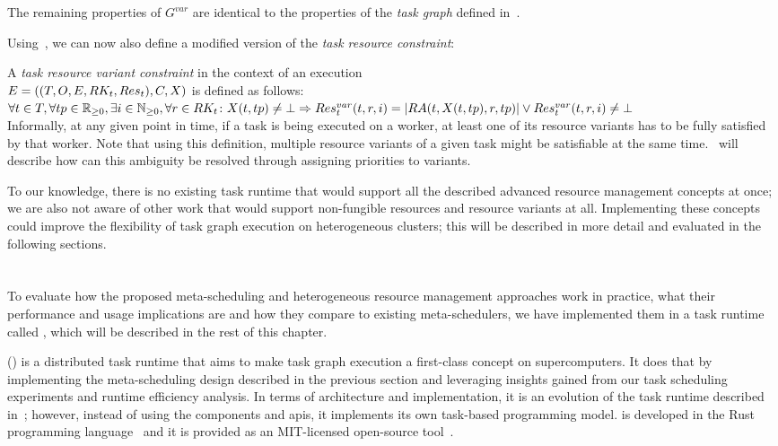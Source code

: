 The remaining properties of $G^{var}$ are identical to the properties of the
\emph{task graph} defined in~.

Using~, we can now also define a modified version of the
\emph{task resource constraint}:

\vspace{2mm} A \emph{task resource variant constraint}
in the context of an execution \\ $E = ((T, O, E, RK_t, Res_t), C, X)$ is defined as follows: \\
$\forall t\in{}T, \forall tp\in\mathbb{R}_{\geq{}0}, \exists
	i\in\mathbb{N}_{\geq{}0}, \forall
	r\in{}RK_t\colon X(t, tp) \neq \bot
	\Rightarrow Res_t^{var}(t, r, i) = |RA(t, X(t, tp), r, tp)| \lor Res_t^{var}(t, r, i) \neq
	\bot$ \\

Informally, at any given point in time, if a task is being executed on a worker, at least one of
its resource variants has to be fully satisfied by that worker. Note that using this definition,
multiple resource variants of a given task might be satisfiable at the same
time.~ will describe how can this ambiguity be resolved through assigning
priorities to variants.

To our knowledge, there is no existing task runtime that would support all the described advanced
resource management concepts at once; we are also not aware of other work that would support
non-fungible resources and resource variants at all. Implementing these concepts could improve the
flexibility of task graph execution on heterogeneous clusters; this will be described in more
detail and evaluated in the following sections.


\section{\hyperqueue{}}
\label{sec:hyperqueue}
To evaluate how the proposed meta-scheduling and heterogeneous resource management approaches work
in practice, what their performance and usage implications are and how they compare to existing
meta-schedulers, we have implemented them in a task runtime called \hyperqueue{}, which
will be described in the rest of this chapter.

\hyperqueue{} (\hq{}) is a distributed task runtime that aims to make task graph execution a
first-class concept on supercomputers. It does that by implementing the meta-scheduling design
described in the previous section and leveraging insights gained from our task scheduling
experiments and \dask{} runtime efficiency analysis. In terms of architecture and
implementation, it is an evolution of the \rsds{} task runtime described
in~; however, instead of using the \dask{} components and
\glspl{api}, it implements its own task-based programming model.
\hyperqueue{} is developed in the Rust programming language~\cite{rust} and
it is provided as an \mbox{MIT-licensed} open-source tool~\cite{hq_github}.

